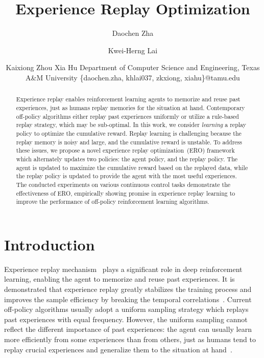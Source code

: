 \documentclass{article}
\title{Experience Replay Optimization}
\author{
Daochen Zha \and
Kwei-Herng Lai \and
Kaixiong Zhou \And
Xia Hu
\affiliations
Department of Computer Science and Engineering, Texas A\&M University
\emails
\{daochen.zha, khlai037, zkxiong, xiahu\}@tamu.edu
}
\begin{document}
\maketitle

\begin{abstract}

Experience replay enables reinforcement learning agents to memorize and reuse past experiences, just as humans replay memories for the situation at hand. Contemporary off-policy algorithms either replay past experiences uniformly or utilize a rule-based replay strategy, which may be sub-optimal. In this work, we consider \emph{learning} a replay policy to optimize the cumulative reward. Replay learning is challenging because the replay memory is noisy and large, and the cumulative reward is unstable. To address these issues, we propose a novel experience replay optimization~(ERO) framework which alternately updates two policies: the agent policy, and the replay policy. The agent is updated to maximize the cumulative reward based on the replayed data, while the replay policy is updated to provide the agent with the most useful experiences. The conducted experiments on various continuous control tasks demonstrate the effectiveness of ERO, empirically showing promise in experience replay learning to improve the performance of off-policy reinforcement learning algorithms.
\end{abstract}

\section{Introduction}

Experience replay mechanism~\cite{lin1992self,lin1993reinforcement} plays a significant role in deep reinforcement learning, enabling the agent to memorize and reuse past experiences. It is demonstrated that experience replay greatly stabilizes the training process and improves the sample efficiency by breaking the temporal correlations~\cite{mnih2013playing,mnih2015human,wang2016sample,van2016deep,andrychowicz2017hindsight,pan2018organizing,sutton2018reinforcement}. Current off-policy algorithms usually adopt a uniform sampling strategy which replays past experiences with equal frequency. However, the uniform sampling cannot reflect the different importance of past experiences: the agent can usually learn more efficiently from some experiences than from others, just as humans tend to replay crucial experiences and generalize them to the situation at hand~\cite{shohamy2015integrating}.
\end{document}

